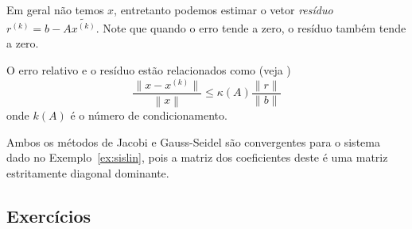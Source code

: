 Em geral não temos $x$, entretanto podemos estimar o vetor \emph{resíduo} $r^{(k)}=b-A\tilde{x^{(k)}}$. Note que quando o erro tende a zero, o resíduo também tende a zero.

\begin{teo}
 O erro relativo e o resíduo estão relacionados como (veja \cite{Burden2013})
\begin{equation}
  \frac{ \|x-x^{(k)}\|}{\left\|x\right\|} \leq  \kappa(A) \frac{\|r\|}{\|b\|}
\end{equation}
onde $k(A)$ é o número de condicionamento.
\end{teo}

\begin{ex}
  Ambos os métodos de Jacobi e Gauss-Seidel são convergentes para o sistema dado no Exemplo~\ref{ex:sislin}, pois a matriz dos coeficientes deste é uma matriz estritamente diagonal dominante.
\end{ex}

\subsection*{Exercícios}

